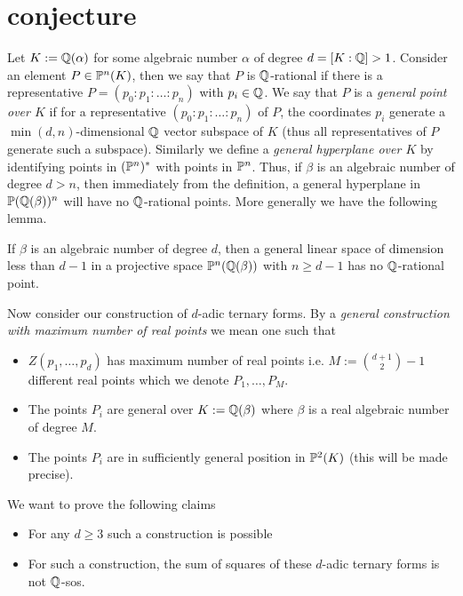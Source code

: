 \section{conjecture}

Let $K:= \Q(\alpha)$ for some algebraic number $\alpha$ of degree $d=[K:\Q]>1$.
Consider an element $P\in\P^n(K)$, then we say that $P$ is $\Q$-rational if there is a representative
$P=(p_0:p_1:\dots:p_n)$ with $p_i \in \Q$. We say that $P$ is a {\it general point over $K$} if for a
representative $(p_0:p_1:\dots :p_n)$ of $P$, the coordinates $p_i$ generate a $\min(d,n)$-dimensional $\Q$ vector
subspace of $K$ (thus all representatives of $P$ generate such a subspace). Similarly we define a {\it general
hyperplane over $K$} by identifying points in $(\P^n)^*$ with points in $\P^n$. Thus, if $\beta$ is an algebraic
number of degree $d>n$, then immediately from the definition, a general hyperplane in $\P(\Q(\beta))^n$ will have no
$\Q$-rational points. More generally we have the following lemma.

\begin{lemma}\label{l-qrational}
If $\beta$ is an algebraic number of degree $d$, then a general linear space of
dimension less than $d-1$ in a projective space $\P^n(\Q(\beta))$ with $n\ge d-1$ has no $\Q$-rational point.
\end{lemma}

Now consider our construction of $d$-adic ternary forms. By a {\it general construction with maximum number of real
points} we mean one such that
\begin{itemize}
\item $Z(p_1,\dots, p_d)$ has maximum number of real points i.e. $M:=\binom{d+1}2-1$ different real points which we
denote $P_1,\dots, P_M$.
\item The points $P_i$ are general over $K:=\Q(\beta)$ where $\beta$ is a real algebraic number of degree $M$.
\item The points $P_i$ are in sufficiently general position in $\P^2(K)$ (this will be made precise).
\end{itemize}

We want to prove the following claims
\begin{itemize}
\item For any $d\ge 3$ such a construction is possible
\item For such a construction, the sum of squares of these $d$-adic ternary forms is not $\Q$-sos.
\end{itemize}

